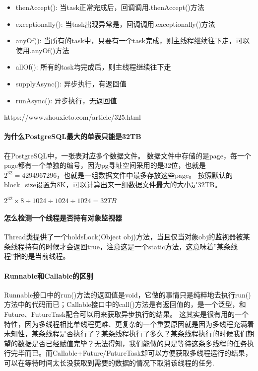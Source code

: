 \documentclass[../../../interview-questions.tex]{subfiles}
\begin{document}
\begin{itemize}
    \item {thenAccept(): 当task正常完成后，回调调用.thenAccept()方法}
    \item {exceptionally(): 当task出现异常是，回调调用.exceptionally()方法}
    \item {anyOf(): 当所有的task中，只要有一个task完成，则主线程继续往下走，可以使用.anyOf()方法}
    \item {allOf(): 所有的task均完成后，则主线程继续往下走}
    \item {supplyAsync(): 异步执行，有返回值}
    \item {runAsync(): 异步执行，无返回值}
\end{itemize}

https://www.shouxicto.com/article/325.html

\paragraph{为什么PostgreSQL最大的单表只能是32TB}

在PostgreSQL中，一张表对应多个数据文件。
数据文件中存储的是page，每一个page都有一个单独的编号，因为pg寻址空间采用的是32位，也就是$2^{32}=4294967296$，也就是一组数据文件中最多存放这些page。
按照默认的block\_size设置为8K，可以计算出来一组数据文件最大的大小是32TB。


$2^{32} \times 8 \div 1024 \div 1024 \div 1024 = 32TB$

\paragraph{怎么检测一个线程是否持有对象监视器}

Thread类提供了一个holdsLock(Object obj)方法，当且仅当对象obj的监视器被某条线程持有的时候才会返回true，注意这是一个static方法，这意味着”某条线程”指的是当前线程。

\paragraph{Runnable和Callable的区别}

Runnable接口中的run()方法的返回值是void，它做的事情只是纯粹地去执行run()方法中的代码而已；Callable接口中的call()方法是有返回值的，是一个泛型，和Future、FutureTask配合可以用来获取异步执行的结果。
这其实是很有用的一个特性，因为多线程相比单线程更难、更复杂的一个重要原因就是因为多线程充满着未知性，某条线程是否执行了？某条线程执行了多久？某条线程执行的时候我们期望的数据是否已经赋值完毕？无法得知，我们能做的只是等待这条多线程的任务执行完毕而已。而Callable+Future/FutureTask却可以方便获取多线程运行的结果，可以在等待时间太长没获取到需要的数据的情况下取消该线程的任务.
\end{document}
